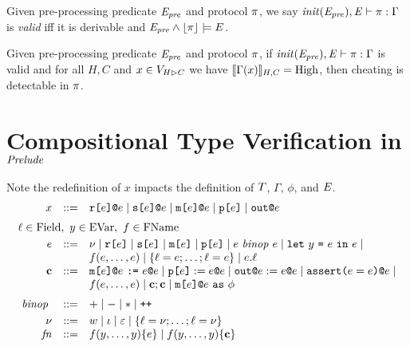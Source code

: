 \begin{definition}
  Given pre-processing predicate $\mathit{E}_{\mathit{pre}}$ and protocol $\pi$, 
  we say $\mathit{init}(\mathit{E}_{\mathit{pre}}),\mathit{E} \vdash \pi : \Gamma$ is \emph{valid}
  iff it is derivable and $\mathit{E}_{\mathit{pre}} \wedge \lfloor \pi \rfloor \models E$.
\end{definition}
  
\begin{theorem}
  Given pre-processing predicate $\mathit{E}_{\mathit{pre}}$ and protocol $\pi$, if
  $\mathit{init}(\mathit{E}_{\mathit{pre}}),\mathit{E} \vdash \pi : \Gamma$ is valid
  and for all $H,C$ and $x \in V_{H \rhd C}$ we have $\llbracket \Gamma(x) \rrbracket_{H,C} = \mathrm{High}$, then cheating
  is detectable in $\pi$.
\end{theorem}

\section{Compositional Type Verification in $\mathit{Prelude}$}

Note the redefinition of $x$ impacts the definition of $T$, $\Gamma$, $\phi$, and $\mathit{E}$.
$$
\begin{array}{rcl}
  x &::=& \elab{\flip{e}}{e} \mid \elab{\secret{e}}{e} \mid \elab{\mesg{e}}{e} \mid \rvl{e} \mid \out{e}\\[2mm]
  \multicolumn{3}{l}{\flab \in \mathrm{Field},\   y \in \mathrm{EVar}, \  f \in \mathrm{FName}}\\[1mm]
  e &::=& \mv \mid \flip{e} \mid \secret{e} \mid \mesg{e} \mid \rvl{e} \mid e \bop e \mid
  \elet{y}{e}{e} \mid \\
  & & f(e,\ldots,e) \mid \{ \flab = e; \ldots; \flab = e \} \mid e.\flab \\
  \cmd &::=& \msend{e}{e}{e}{e} \mid \reveal{e}{e}{e} \mid \pubout{e}{e}{e} \mid
      \elab{\assert{e = e}}{e} \mid \\
  & & f(e,\ldots,e) \mid  \cmd;\cmd \mid \eqcast{\mx{e}{e}}{\phi} \\[2mm] %
  \bop &::=& \fplus \mid \fminus \mid \ftimes \mid \concat  \\[1mm]%
  \mv &::=& w \mid \cid \mid \be \mid \{ \flab = \mv;\ldots;\flab = \mv \} 
  \\ %
  \mathit{fn} &::=& f(y,\ldots,y) \{ e \} \mid  f(y,\ldots,y) \{ \cmd \} %
\end{array}
$$

